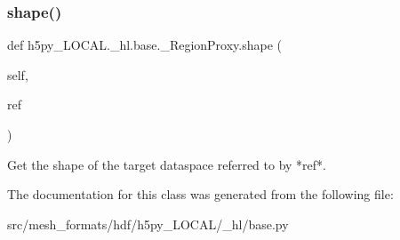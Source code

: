 \subsubsection{\texorpdfstring{shape()}{shape()}}
{\footnotesize\ttfamily def h5py\+\_\+\+L\+O\+C\+A\+L.\+\_\+hl.\+base.\+\_\+\+Region\+Proxy.\+shape (\begin{DoxyParamCaption}\item[{}]{self,  }\item[{}]{ref }\end{DoxyParamCaption})}

\begin{DoxyVerb}Get the shape of the target dataspace referred to by *ref*. \end{DoxyVerb}
 

The documentation for this class was generated from the following file\+:\begin{DoxyCompactItemize}
\item 
src/mesh\+\_\+formats/hdf/h5py\+\_\+\+L\+O\+C\+A\+L/\+\_\+hl/base.\+py\end{DoxyCompactItemize}
